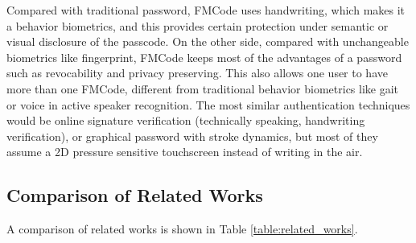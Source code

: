 \documentclass[conference]{IEEEtran}
\begin{document}
Compared with traditional password, FMCode uses handwriting, which makes it a behavior biometrics, and this provides certain protection under semantic or visual disclosure of the passcode. On the other side, compared with unchangeable biometrics like fingerprint, FMCode keeps most of the advantages of a password such as revocability and privacy preserving. This also allows one user to have more than one FMCode, different from traditional behavior biometrics like gait or voice in active speaker recognition. The most similar authentication techniques would be online signature verification (technically speaking, handwriting verification), or graphical password with stroke dynamics, but most of they assume a 2D pressure sensitive touchscreen instead of writing in the air.



\subsection{Comparison of Related Works}

A comparison of related works is shown in Table \ref{table:related_works}.
\end{document}
